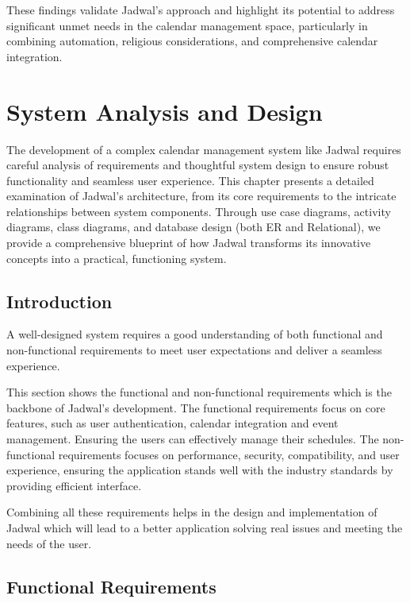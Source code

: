 \documentclass[12pt,a4paper]{report}
\begin{document}
These findings validate Jadwal's approach and highlight its potential to address significant unmet needs in the calendar management space, particularly in combining automation, religious considerations, and comprehensive calendar integration.

\chapter{System Analysis and Design}

The development of a complex calendar management system like Jadwal requires careful analysis of requirements and thoughtful system design to ensure robust functionality and seamless user experience. This chapter presents a detailed examination of Jadwal's architecture, from its core requirements to the intricate relationships between system components. Through use case diagrams, activity diagrams, class diagrams, and database design (both ER and Relational), we provide a comprehensive blueprint of how Jadwal transforms its innovative concepts into a practical, functioning system.

\section{Introduction}

A well-designed system requires a good understanding of both functional and non-functional requirements to meet user expectations and deliver a seamless experience.

This section shows the functional and non-functional requirements which is the backbone of Jadwal's development. The functional requirements focus on core features, such as user authentication, calendar integration and event management. Ensuring the users can effectively manage their schedules. The non-functional requirements focuses on performance, security, compatibility, and user experience, ensuring the application stands well with the industry standards by providing efficient interface.

Combining all these requirements helps in the design and implementation of Jadwal which will lead to a better application solving real issues and meeting the needs of the user.

\section{Functional Requirements}
\end{document}
